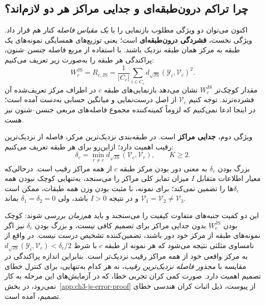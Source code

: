 \subsection{چرا تراکم درون‌طبقه‌ای و جدایی مراکز هر دو لازم‌اند؟}
\label{cmp:subsec:ch3-compactness-separation}
اکنون می‌توان دو ویژگی مطلوب بازنمایی را با \emph{یک مقیاس فاصله} کنار هم قرار داد. ویژگی نخست، \textbf{فشردگی درون‌طبقه‌ای} است؛ یعنی توزیع‌های همسایگی نمونه‌های یک طبقه به مرکز همان طبقه نزدیک باشند. با استفاده از مربع فاصله جنسن--شنون، پراکندگی هر طبقه را به‌صورت زیر تعریف می‌کنیم:
\begin{equation}\label{cmp:eq:ch3-js-within-dispersion}
\boxed{
W_c^{\mathrm{JS}}=R_{c,\mathrm{JS}}
=\frac1{|C_c|}\sum_{i\in C_c}
d_{\sqrt{\mathrm{JS}}}(\mathscr Y_i,\mathcal V_c)^2.
}
\end{equation}
مقدار کوچک‌تر $W_c^{\mathrm{JS}}$ نشان می‌دهد بازنمایی‌های طبقه $c$ در اطراف مرکز تعریف‌شده آن فشرده‌ترند. توجه کنیم $\mathcal V_c$ از اصل درست‌نمایی و میانگین حسابی به‌دست آمده است؛ در اینجا ادعا نمی‌کنیم که لزوماً کمینه‌کننده مجموع فاصله‌های مربعی جنسن--شنون نیز هست.

ویژگی دوم، \textbf{جدایی مراکز} است. در طبقه‌بندی نزدیک‌ترین مرکز، فاصله از نزدیک‌ترین رقیب اهمیت دارد؛ ازاین‌رو برای هر طبقه تعریف می‌کنیم:
\begin{equation}\label{cmp:eq:ch3-js-center-separation}
\boxed{\delta_c
=\min_{r\ne c}d_{\sqrt{\mathrm{JS}}}(\mathcal V_c,\mathcal V_r),
\qquad K\ge2.}
\end{equation}
بزرگ بودن $\delta_c$ به معنی دور بودن مرکز طبقه $c$ از همه مراکز رقیب است. درحالی‌که معیار اطلاعات متقابل $I$ میزان تمایز کلی مراکز را می‌سنجد، به‌تنهایی کوچک نبودن همه $\delta_c$ها را تضمین نمی‌کند؛ برای نمونه، با مثبت بودن وزن همه طبقات، ممکن است $\mathcal V_1=\mathcal V_2\ne\mathcal V_3$ و در نتیجه $I>0$ باشد، ولی $\delta_1=\delta_2=0$ بماند.

این دو کمیت جنبه‌های متفاوت کیفیت را می‌سنجند و باید \emph{هم‌زمان} بررسی شوند: کوچک بودن $W_c^{\mathrm{JS}}$ بدون جدایی مراکز برای تصمیم کافی نیست، و بزرگ بودن $\delta_c$ نیز اگر نمونه‌های طبقه از مرکز خود دور باشند، تضمین‌کننده تشخیص درست نیست. در واقع از نامساوی مثلثی نتیجه می‌شود که هر نمونه از طبقه $c$ با شرط
$d_{\sqrt{\mathrm{JS}}}(\mathscr Y_i,\mathcal V_c)<\delta_c/2$
به مرکز واقعی خود از همه مراکز رقیب نزدیک‌تر است. بنابراین اندازه پراکندگی در مقایسه با \emph{مجذور فاصله نزدیک‌ترین رقیب}، نه هر کدام به‌تنهایی، برای کنترل خطای تصمیم اهمیت دارد. صورت کمی کران تجربی خطا، که در آزمایش‌های این مرحله به کار نمی‌رود، در بخش~\ref{app:ch3-js-error-proof} از پیوست، ذیل اثبات کران هندسی خطای تصمیم، آمده است.


